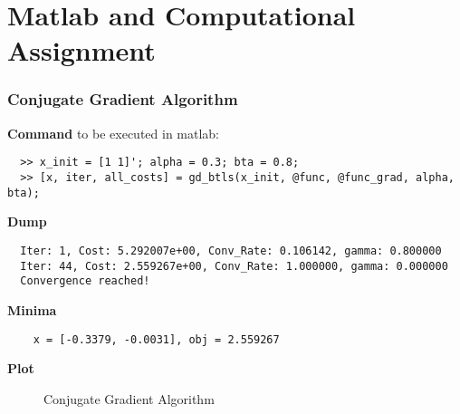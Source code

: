 \documentclass[11pt,a4paper]{article}
\begin{document}
\begin{titlepage}
    \maketitle
\end{titlepage}
\renewcommand{\contentsname}{Table of Contents}
\begin{center} 
    \tableofcontents 
    \listoffigures
\end{center}
\newpage

\part{Matlab and Computational Assignment}
\section{Conjugate Gradient Algorithm}
{\bf Command} to be executed in matlab:
\begin{verbatim}
  >> x_init = [1 1]'; alpha = 0.3; bta = 0.8;
  >> [x, iter, all_costs] = gd_btls(x_init, @func, @func_grad, alpha, bta);
\end{verbatim}
{\bf Dump}
\begin{verbatim}
  Iter: 1, Cost: 5.292007e+00, Conv_Rate: 0.106142, gamma: 0.800000
  Iter: 44, Cost: 2.559267e+00, Conv_Rate: 1.000000, gamma: 0.000000
  Convergence reached!
\end{verbatim}
{\bf Minima}
\begin{verbatim}
    x = [-0.3379, -0.0031], obj = 2.559267 
   \end{verbatim}
{\bf Plot}
\begin{figure}[h]
    \centering
    \caption{Conjugate Gradient Algorithm}
\end{figure}
\end{document}
